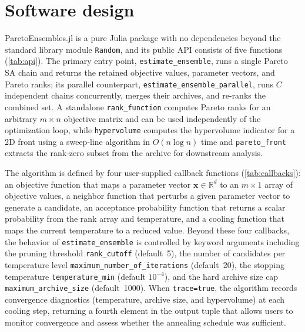 \documentclass[12pt]{article}
\begin{document}
\clearpage
\section{Software design}\label{sec:si_software}
ParetoEnsembles.jl is a pure Julia package with no dependencies beyond the standard library module \texttt{Random}, and its public API consists of five functions (\cref{tab:api}).
The primary entry point, \texttt{estimate\_ensemble}, runs a single Pareto SA chain and returns the retained objective values, parameter vectors, and Pareto ranks; its parallel counterpart, \texttt{estimate\_ensemble\_parallel}, runs $C$ independent chains concurrently, merges their archives, and re-ranks the combined set.
A standalone \texttt{rank\_function} computes Pareto ranks for an arbitrary $m \times n$ objective matrix and can be used independently of the optimization loop, while \texttt{hypervolume} computes the hypervolume indicator for a 2D front using a sweep-line algorithm in $O(n \log n)$ time and \texttt{pareto\_front} extracts the rank-zero subset from the archive for downstream analysis.

\begin{sloppypar}
The algorithm is defined by four user-supplied callback functions (\cref{tab:callbacks}): an objective function that maps a parameter vector $\mathbf{x} \in \mathbb{R}^d$ to an $m \times 1$ array of objective values, a neighbor function that perturbs a given parameter vector to generate a candidate, an acceptance probability function that returns a scalar probability from the rank array and temperature, and a cooling function that maps the current temperature to a reduced value.
Beyond these four callbacks, the behavior of \texttt{estimate\_ensemble} is controlled by keyword arguments including the pruning threshold \texttt{rank\_cutoff} (default~5), the number of candidates per temperature level \texttt{maximum\_number\_of\_iterations} (default~20), the stopping temperature \texttt{temperature\_min} (default $10^{-4}$), and the hard archive size cap \texttt{maximum\_archive\_size} (default~1000).
When \texttt{trace=true}, the algorithm records convergence diagnostics (temperature, archive size, and hypervolume) at each cooling step, returning a fourth element in the output tuple that allows users to monitor convergence and assess whether the annealing schedule was sufficient.
\end{sloppypar}
\end{document}
